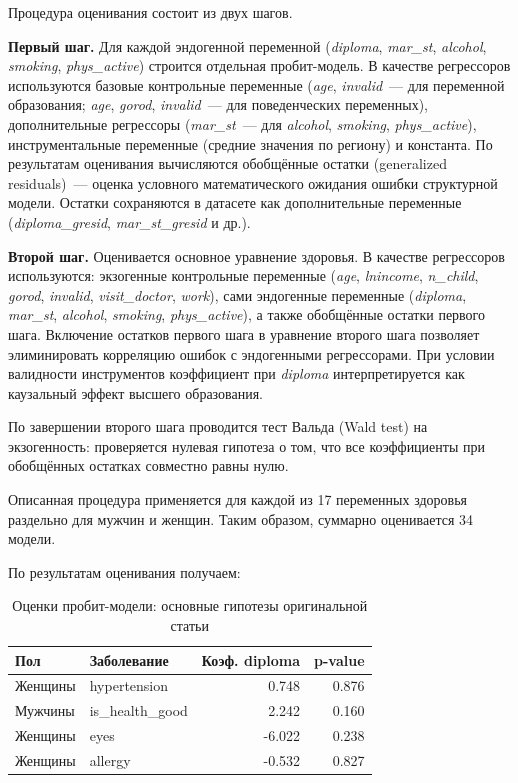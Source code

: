 \documentclass[a4paper,12pt]{article}
\begin{document}
Процедура оценивания состоит из двух шагов.

\textbf{Первый шаг.}
Для каждой эндогенной переменной (\textit{diploma}, \textit{mar\_st}, \textit{alcohol}, \textit{smoking}, \textit{phys\_active})
строится отдельная пробит-модель.
В качестве регрессоров используются базовые контрольные переменные
(\textit{age}, \textit{invalid}~--- для переменной образования;
\textit{age}, \textit{gorod}, \textit{invalid}~--- для поведенческих переменных),
дополнительные регрессоры (\textit{mar\_st}~--- для \textit{alcohol}, \textit{smoking}, \textit{phys\_active}),
инструментальные переменные (средние значения по региону) и константа.
По результатам оценивания вычисляются обобщённые остатки (generalized residuals)~---
оценка условного математического ожидания ошибки структурной модели.
Остатки сохраняются в датасете как дополнительные переменные
(\textit{diploma\_gresid}, \textit{mar\_st\_gresid} и др.).

\textbf{Второй шаг.}
Оценивается основное уравнение здоровья. В качестве регрессоров используются:
экзогенные контрольные переменные
(\textit{age}, \textit{lnincome}, \textit{n\_child}, \textit{gorod}, \textit{invalid}, \textit{visit\_doctor}, \textit{work}),
сами эндогенные переменные (\textit{diploma}, \textit{mar\_st}, \textit{alcohol}, \textit{smoking}, \textit{phys\_active}),
а также обобщённые остатки первого шага.
Включение остатков первого шага в уравнение второго шага позволяет элиминировать корреляцию ошибок с эндогенными регрессорами.
При условии валидности инструментов коэффициент при \textit{diploma} интерпретируется как каузальный эффект высшего образования.

По завершении второго шага проводится тест Вальда (Wald test) на экзогенность:
проверяется нулевая гипотеза о том, что все коэффициенты при обобщённых остатках совместно равны нулю.

Описанная процедура применяется для каждой из 17 переменных здоровья раздельно для мужчин и женщин.
Таким образом, суммарно оценивается 34 модели.

По результатам оценивания получаем:

\begin{table}[H]
\centering
\caption{Оценки пробит-модели: основные гипотезы оригинальной статьи}
\begin{tabular}{@{}llrr@{}}
\toprule
\textbf{Пол} & \textbf{Заболевание} & \textbf{Коэф. diploma} & \textbf{p-value} \\
\midrule
Женщины & hypertension    &  0.748 & 0.876 \\
Мужчины & is\_health\_good & 2.242  & 0.160 \\
Женщины & eyes            & -6.022 & 0.238 \\
Женщины & allergy         & -0.532 & 0.827 \\
\bottomrule
\end{tabular}
\end{table}
\end{document}
